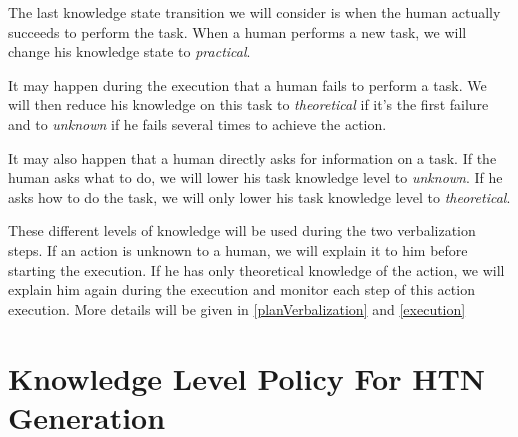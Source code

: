 \documentclass{llncs}
\begin{document}
The last knowledge state transition we will consider is when the human actually succeeds to perform the task. When a human performs a new task, we will change his knowledge state to \textit{practical}.


It may happen during the execution that a human fails to perform a task.
We will then reduce his knowledge on this task to \textit{theoretical} if it's the first failure and to \textit{unknown} if he fails several times to achieve the action.

It may also happen that a human directly asks for information on a task.
If the human asks what to do, we will lower his task knowledge level to \textit{unknown}. If he asks how to do the task, we will only lower his task knowledge level to \textit{theoretical}.

These different levels of knowledge will be used during the two verbalization steps. If an action is unknown to a human, we will explain it to him before starting the execution. If he has only theoretical knowledge of the action, we will explain him again during the execution and monitor each step of this action execution. More details will be given in \ref{planVerbalization} and \ref{execution}



\section{Knowledge Level Policy For HTN Generation}
\label{planning}

\end{document}
